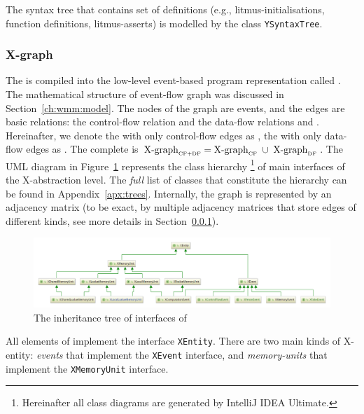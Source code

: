 The syntax tree that contains set of definitions (e.g., litmus-initialisations, function definitions, litmus-asserts) is modelled by the class \texttt{YSyntaxTree}.


\subsubsection{X-graph}
\label{ch:impl:model:xgraph}

The \ytree{} is compiled into the low-level event-based program representation called \textit{\xgraph{}}.
The mathematical structure of event-flow graph was discussed in Section~\ref{ch:wmm:model}.
The nodes of the graph are events, and the edges are basic relations: the control-flow relation \po{} and the data-flow relations \co{} and \rf{}.
Hereinafter, we denote the \xgraph{} with only control-flow edges as \xgraph[CF], the \xgraph{} with only data-flow edges as \xgraph[CF].
The complete \xgraph{} is $\xgraph[CF+DF] = \xgraph[CF] \; \cup \; \xgraph[DF]$.
The UML diagram in Figure~\ref{fig:class-diagrams:XEntity-interfaces} represents the class hierarchy%
%
\footnote{Hereinafter all class diagrams are generated by IntelliJ IDEA Ultimate.}%
%
of main interfaces of the X-abstraction level.
The \textit{full} list of classes that constitute the \xgraph{} hierarchy can be found in Appendix~\ref{apx:trees}.
Internally, the graph is represented by an adjacency matrix (to be exact, by multiple adjacency matrices that store edges of different kinds, see more details in Section~\ref{ch:impl:model:xgraph}).

\begin{figure}[t]%
  \centering
  \includegraphics[width=\textwidth,keepaspectratio]{img/my/class-diagrams/XEntity-interfaces.png}
  \caption{The inheritance tree of interfaces of \xgraph{}}
  \label{fig:class-diagrams:XEntity-interfaces}
\end{figure}

All elements of \xgraph{} implement the interface \texttt{XEntity}.
There are two main kinds of X-entity: \textit{events} that implement the \texttt{XEvent} interface, and \textit{memory-units} that implement the \texttt{XMemoryUnit} interface.

